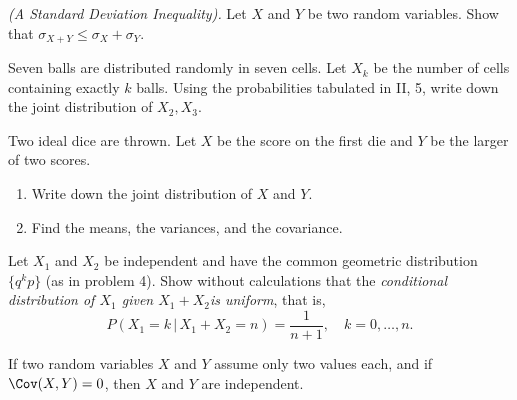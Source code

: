 \begin{problem}[Handout 15, \# 16]
  \emph{(A Standard Deviation Inequality).} Let \(X\) and \(Y\) be two
  random variables. Show that \(\sigma_{X+Y}\leq\sigma_X+\sigma_Y\).
\end{problem}
\begin{solution}

\end{solution}
\newpage

\begin{problem}[Handout 15, \# 17]
  Seven balls are distributed randomly in seven cells. Let \(X_k\) be
  the number of cells containing exactly \(k\) balls. Using the
  probabilities tabulated in II, 5, write down the joint distribution of
  \(X_2,X_3\).
\end{problem}
\begin{solution}

\end{solution}
\newpage

\begin{problem}[Handout 15, \# 18]
  Two ideal dice are thrown. Let \(X\) be the score on the first die and
  \(Y\) be the larger of two scores.
  \begin{enumerate}[label=(\alph*),noitemsep]
  \item Write down the joint distribution of \(X\) and \(Y\).
  \item Find the means, the variances, and the covariance.
  \end{enumerate}
  \end{problem}
\begin{solution}

\end{solution}
\newpage

\begin{problem}[Handout 15, \# 19]
  Let \(X_1\) and \(X_2\) be independent and have the common
  geometric distribution \(\{q^kp\}\) (as in problem 4). Show without
  calculations that the \emph{conditional distribution of \(X_1\) given
    \(X_1+X_2\)is uniform}, that is,
  \begin{equation}
    \label{eq:12:uniform-conditional-pmf}
    P(X_1=k\,|\,X_1+X_2=n)=\frac{1}{n+1},\quad k=0,\dotsc,n.
  \end{equation}
\end{problem}
\begin{solution}

\end{solution}
\newpage

\begin{problem}[Handout 15, \# 20]
  If two random variables \(X\) and \(Y\) assume only two values
  each, and if \(\Cov(X,Y)=0\), then \(X\) and \(Y\) are
  independent.
\end{problem}
\begin{solution}

\end{solution}

